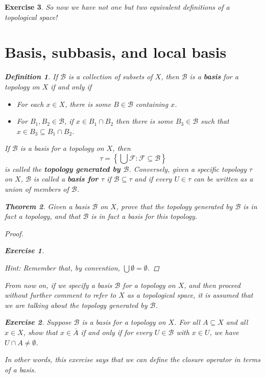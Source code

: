 \documentclass[12pt]{amsart}
\newtheorem{theorem}{Theorem}[section]
\newtheorem{exercise}{Exercise}[section]
\theoremstyle{definition}
\newtheorem{definition}[theorem]{Definition}
\theoremstyle{remark}
\newcommand{\explicitSet}[1]{\left\lbrace #1 \right\rbrace}
\newcommand{\set}[2]{\explicitSet{#1 \colon #2}}
\newcommand{\0}{\emptyset}
\newcommand{\closure}[1]{\overline{#1}}
\newcommand{\F}{\mathcal F}
\newcommand{\B}{\mathcal B}
\begin{document}
\begin{exercise}
So now we have not one but two equivalent definitions of a topological space!

\section{Basis, subbasis, and local basis}

\begin{definition}
If $\B$ is a collection of subsets of $X$, then $\B$ is a \textbf{basis} for a topology on $X$ if and only if
\begin{itemize}
\item For each $x \in X$, there is some $B \in \B$ containing $x$.
\item For $B_1,B_2 \in \B$, if $x \in B_1 \cap B_2$ then there is some $B_3 \in \B$ such that $x \in B_3 \subseteq B_1 \cap B_2$.
\end{itemize}
\end{definition}

If $\B$ is a basis for a topology on $X$, then
$$\tau = \set{\bigcup \F}{\F \subseteq \B}$$
is called the \textbf{topology generated by $\B$}. Conversely, given a specific topology $\tau$ on $X$, $\B$ is called a \textbf{basis for $\tau$} if $\B \subseteq \tau$ and if every $U \in \tau$ can be written as a union of members of $\B$.

\begin{theorem}
Given a basis $\B$ on $X$, prove that the topology generated by $\B$ is in fact a topology, and that $\B$ is in fact a basis for this topology.
\end{theorem}
\begin{proof}
\begin{exercise}\end{exercise}
\emph{Hint: Remember that, by convention, $\bigcup \0 = \0$.}
\end{proof}

From now on, if we specify a basis $\B$ for a topology on $X$, and then proceed without further comment to refer to $X$ as a topological space, it is assumed that we are talking about the topology generated by $\B$.

\begin{exercise}
Suppose $\B$ is a basis for a topology on $X$. For all $A \subseteq X$ and all $x \in X$, show that $x \in \closure{A}$ if and only if for every $U \in \B$ with $x \in U$, we have $U \cap A \neq \0$.
\end{exercise}

In other words, this exercise says that we can define the closure operator in terms of a basis.


\end{exercise}
\end{document}
